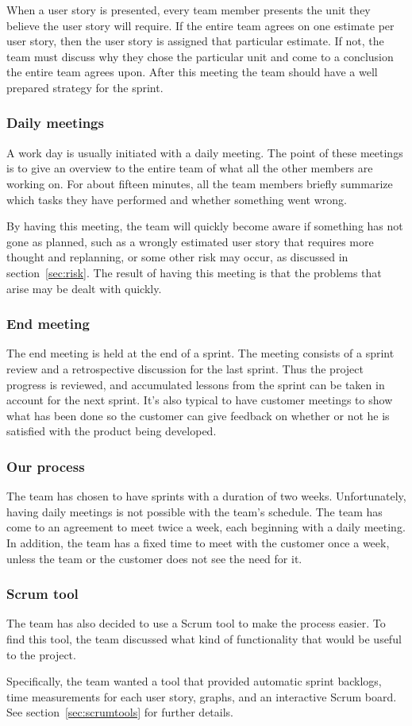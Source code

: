 When a user story is presented, every team member presents the unit they believe the user story will require. If the entire team agrees on one estimate per user story, then the user story is assigned that particular estimate. If not, the team must discuss why they chose the particular unit and come to a conclusion the entire team agrees upon.
After this meeting the team should have a well prepared strategy for the sprint.

\subsubsection{Daily meetings}
A work day is usually initiated with a daily meeting. The point of these meetings is to give an overview to the entire team of what all the other members are working on. For about fifteen minutes, all the team members briefly summarize which tasks they have performed and whether something went wrong.

By having this meeting, the team will quickly become aware if something has not gone as planned, such as a wrongly estimated user story that requires more thought and replanning, or some other risk may occur, as discussed in section~\ref{sec:risk}. The result of having this meeting is that the problems that arise may be dealt with quickly.

\subsubsection{End meeting}
The end meeting is held at the end of a sprint. The meeting consists of a sprint review and a retrospective discussion for the last sprint.
Thus the project progress is reviewed, and accumulated lessons from the sprint can be taken in account for the next sprint.
It's also typical to have customer meetings to show what has been done so the customer can give feedback on 
whether or not he is satisfied with the product being developed.

\subsubsection{Our process}
The team has chosen to have sprints with a duration of two weeks. Unfortunately, having daily meetings is not possible with the team's schedule. The team has come to an agreement to meet twice a week, each beginning with a daily meeting. In addition, the team has a fixed time to meet with the customer once a week, unless the team or the customer does not see the need for it.

\subsubsection{Scrum tool}
The team has also decided to use a Scrum tool to make the process easier.
To find this tool, the team discussed what kind of functionality that would be useful to the project.

Specifically, the team wanted a tool that provided automatic sprint backlogs, time measurements for each user story, graphs, and an interactive Scrum board. See section~\ref{sec:scrumtools} for further details.

